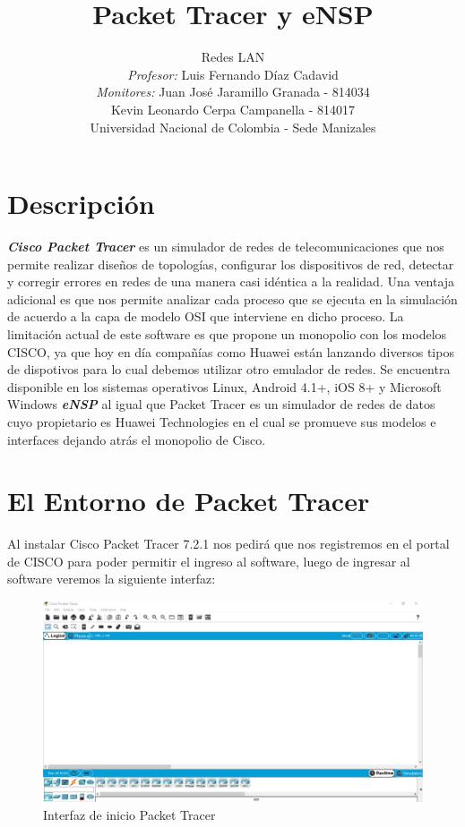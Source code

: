 \documentclass[journal]{IEEEtran}
\title{\textbf{Packet Tracer y eNSP}}
\author{Redes LAN \\
	\textit{Profesor:} Luis Fernando Díaz Cadavid\\ 
	\textit{Monitores:} Juan José Jaramillo Granada - 814034 \\
	Kevin Leonardo Cerpa Campanella - 814017 \\
	Universidad Nacional de Colombia - Sede Manizales}
\date{}
\begin{document}
\maketitle

\section{Descripción}
\textbf{\textit{Cisco Packet Tracer}} es un simulador de redes de telecomunicaciones que nos permite realizar diseños de topologías, configurar los dispositivos de red, detectar y corregir errores en redes de una manera casi idéntica a la realidad. Una ventaja adicional es que nos permite analizar cada proceso que se ejecuta en la simulación de acuerdo a la capa de modelo OSI que interviene en dicho proceso. La limitación actual de este software es que propone un monopolio con los modelos CISCO, ya que hoy en día compañías como Huawei están lanzando diversos tipos de dispotivos para lo cual debemos utilizar otro emulador de redes. Se encuentra disponible en los sistemas operativos Linux, Android 4.1+, iOS 8+ y Microsoft Windows \cite{pt_wiki} \newline
\textbf{\textit{eNSP}} al igual que Packet Tracer es un simulador de redes de datos cuyo propietario es Huawei Technologies en el cual se promueve sus modelos e interfaces dejando atrás el monopolio de Cisco.

\section{El Entorno de Packet Tracer}
Al instalar Cisco Packet Tracer 7.2.1 nos pedirá que nos registremos en el portal de CISCO para poder permitir el ingreso al software, luego de ingresar al software veremos la siguiente interfaz:

\begin{figure}[ht]
	\centering
	\includegraphics[scale=0.17]{index_pt.jpg}
	\caption{Interfaz de inicio Packet Tracer}
	\label{index_pt}
\end{figure}
\end{document}
